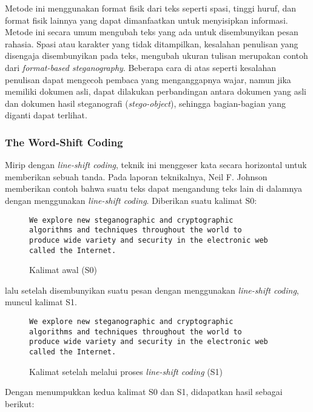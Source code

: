 Metode ini menggunakan format fisik dari teks seperti spasi, tinggi huruf, dan format fisik lainnya yang dapat dimanfaatkan untuk menyisipkan informasi. Metode ini secara umum mengubah teks yang ada untuk disembunyikan pesan rahasia. Spasi atau karakter yang tidak ditampilkan, kesalahan penulisan yang disengaja disembunyikan pada teks, mengubah ukuran tulisan merupakan contoh dari \textit{format-based steganography}. Beberapa cara di atas seperti kesalahan penulisan dapat mengecoh pembaca yang menganggapnya wajar, namun jika memiliki dokumen asli, dapat dilakukan perbandingan antara dokumen yang asli dan dokumen hasil steganografi (\textit{stego-object}), sehingga bagian-bagian yang diganti dapat terlihat.

\subsubsection{The Word-Shift Coding}

Mirip dengan \textit{line-shift coding}, teknik ini menggeser kata secara horizontal untuk memberikan sebuah tanda. Pada laporan teknikalnya, Neil F. Johnson memberikan contoh bahwa suatu teks dapat mengandung teks lain di dalamnya dengan menggunakan \textit{line-shift coding}\cite{Neil:1995}. Diberikan suatu kalimat S0:
\begin{figure}[H]
	\texttt{We  explore  new  steganographic  and  cryptographic\\
	algorithms  and  techniques  throughout  the  world  to\\
	produce  wide  variety  and  security  in  the  electronic  web\\
	called  the  Internet.}
	\caption{Kalimat awal (S0)} 
\end{figure}

lalu setelah disembunyikan suatu pesan dengan menggunakan \textit{line-shift coding}, muncul kalimat S1.

\begin{figure}[H]
	\texttt{We   explore new  steganographic  and  cryptographic\\
	algorithms  and  techniques  throughout   the  world to\\
	produce   wide variety  and  security  in  the  electronic   web\\
	called  the  Internet.}
	\caption{Kalimat setelah melalui proses \textit{line-shift coding} (S1)}
\end{figure}

Dengan menumpukkan kedua kalimat S0 dan S1, didapatkan hasil sebagai berikut:

